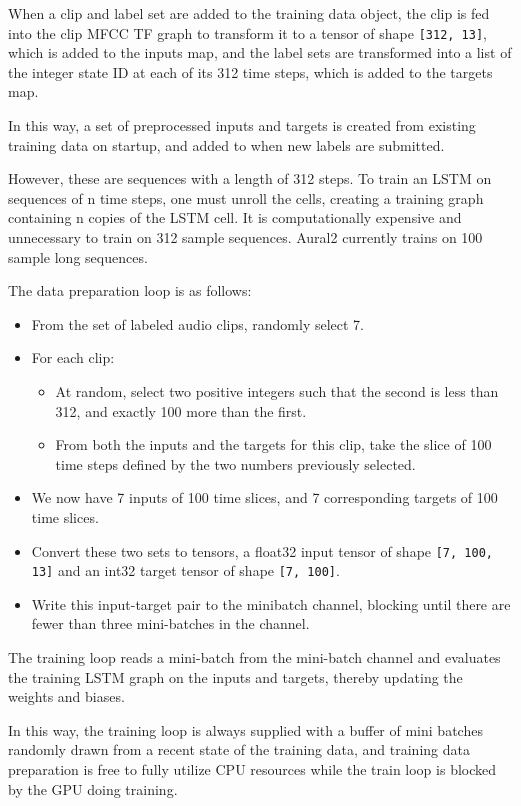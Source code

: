 \documentclass[conference]{IEEEtran}
\begin{document}
When a clip and label set are added to the training data object,
the clip is fed into the clip MFCC TF graph to transform it to a tensor of
shape \texttt{[312, 13]}, which is added to the inputs map,
and the label sets are transformed into a list of the integer state ID at each of its 312 time steps,
which is added to the targets map.

In this way, a set of preprocessed inputs and targets is created from
existing training data on startup, and added to when new labels are
submitted.

However, these are sequences with a length of 312 steps.
To train an LSTM on sequences of n time steps, one must unroll the cells, creating a training graph containing n copies of the LSTM cell.
It is computationally expensive and unnecessary to train on 312 sample sequences.
Aural2 currently trains on 100 sample long sequences.

The data preparation loop is as follows:

\begin{itemize}
\item From the set of labeled audio clips, randomly select 7.
\item For each clip:
\begin{itemize}
  \item At random, select two positive integers such that the second is less than 312, and exactly 100 more than the first.
  \item From both the inputs and the targets for this clip, take the slice of 100 time steps defined by the two numbers previously selected.
\end{itemize}
\item We now have 7 inputs of 100 time slices, and 7 corresponding targets of 100 time slices.
\item Convert these two sets to tensors, a float32 input tensor of shape \texttt{[7, 100, 13]} and an int32 target tensor of shape \texttt{[7, 100]}.
\item Write this input-target pair to the minibatch channel, blocking until there are fewer than three mini-batches in the channel.
\end{itemize}

The training loop reads a mini-batch from the mini-batch channel and
evaluates the training LSTM graph on the inputs and targets, thereby
updating the weights and biases.

In this way, the training loop is always supplied with a buffer of mini
batches randomly drawn from a recent state of the training data, and
training data preparation is free to fully utilize CPU resources while the train
loop is blocked by the GPU doing training.
\end{document}
